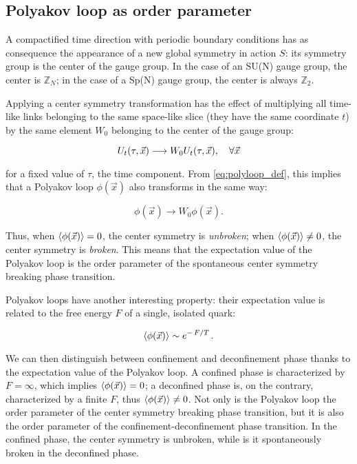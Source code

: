 \documentclass[reqno,12pt]{article}
\numberwithin{equation}{section}
\begin{document}
\subsection{Polyakov loop as order parameter}

A compactified time direction with periodic boundary conditions has as consequence the appearance of a new
global symmetry in action $S$: its symmetry group is the center of the gauge group. In the case of an SU(N) gauge
group, the center is $\mathbb{Z}_N$; in the case of a Sp(N) gauge group, the center is always $\mathbb{Z}_2$.

Applying a center symmetry transformation has the effect of multiplying all time-like links belonging to the same space-like slice (they have
the same coordinate $t$) by the same element $W_0$ belonging to the center of the gauge group:

\begin{equation}
	U_t(\tau, \vec{x}) \longrightarrow W_0 U_t(\tau, \vec{x}) \qc \forall \vec{x}
\end{equation}

for a fixed value of $\tau$, the time component. From \eqref{eq:polyloop_def}, this implies that a Polyakov loop $\phi(\vec{x})$ also 
transforms in the same way:

\begin{equation}
	\phi(\vec{x}) \longrightarrow W_0 \phi(\vec{x}).
\end{equation}

Thus, when $\expval{\phi(\vec{x})} = 0$, the center symmetry is \textit{unbroken}; when $\expval{\phi(\vec{x})} \neq 0$, the center symmetry
is \textit{broken}. This means that the expectation value of the Polyakov loop is the order parameter of the spontaneous center symmetry
breaking phase transition.

Polyakov loops have another interesting property: their expectation value is related to the free energy $F$ of a single, isolated quark:

\begin{equation}
	\expval{\phi(\vec{x})} \sim e^{-\flatfrac{F}{T}}.
\end{equation}

We can then distinguish between confinement and deconfinement phase thanks to the expectation value of the Polyakov loop. A confined
phase is characterized by $F = \infty$, which implies $\expval{\phi(\vec{x})} = 0$; a deconfined phase is, on the contrary, characterized
by a finite $F$, thus $\expval{\phi(\vec{x})} \neq 0$. Not only is the Polyakov loop the order parameter of the center symmetry breaking phase
transition, but it is also the order parameter of the confinement-deconfinement phase transition. In the confined phase, the center symmetry
is unbroken, while is it spontaneously broken in the deconfined phase. 
\end{document}
